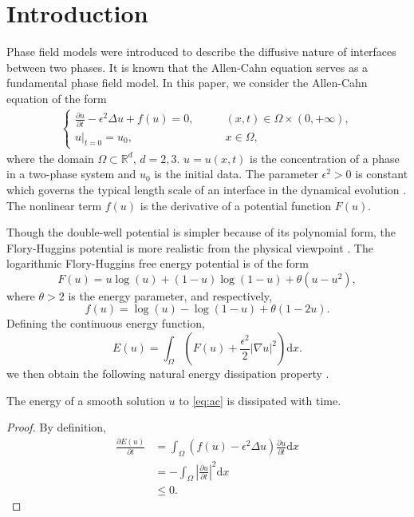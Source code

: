 \section{Introduction}
\label{section:introduction}
Phase field models \cite{chen2002phase,steinbach2013phase} were introduced to describe the diffusive nature of interfaces between two phases. 
It is known that the Allen-Cahn equation \cite{allen1979microscopic} serves as a fundamental phase field model. 
In this paper, we consider the Allen-Cahn equation of the form
\begin{align}\label{eq:ac}
      \begin{cases}
    \frac{\partial u}{\partial t}-\epsilon^2\Delta u+f(u)=0, &\qquad (x,t)\in \Omega \times (0,+\infty),\\
    u|_{t=0}=u_0,&\qquad x\in \Omega,
\end{cases}
\end{align}
where the domain $\Omega \subset \mathbb{R}^d$, $d=2,3$. $u=u(x,t)$ is the concentration of a phase in a two-phase system and $u_0$ is the initial data. 
The parameter $\epsilon^2>0$ is constant which governs the typical length scale of an interface in the dynamical evolution \cite{wang1993thermodynamically,wheeler1992phase}. 
The nonlinear term $f(u)$ is the derivative of a potential function $F(u)$. 
\par Though the double-well potential is simpler because of its polynomial form, the Flory-Huggins potential is more realistic from the physical viewpoint \cite{flory1942thermodynamics}. 
The logarithmic Flory-Huggins free energy potential is of the form
\begin{equation}
    F(u)=u\log(u)+(1-u)\log(1-u)+\theta(u-u^2),
\end{equation}
where $\theta>2$ is the energy parameter, and respectively,
\begin{equation}
    f(u)=\log(u)-\log(1-u)+\theta(1-2u).
\end{equation}
Defining the continuous energy function,
\begin{equation}
    E(u)=\int_{\Omega} (F(u)+\frac{\epsilon^2}{2}|\nabla u|^2)\text{d}x.
\end{equation}
we then obtain the following natural energy dissipation property \cite{allen1979microscopic}.
\begin{proposition}\label{prop:sta}
    The energy of a smooth solution $u$ to \eqref{eq:ac} is dissipated with time.
\end{proposition}
\begin{proof}
    By definition, 
    \begin{equation}
        \begin{aligned}
        \frac{\partial E(u)}{\partial t}
        &=\int_{\Omega}(f(u) - \epsilon^2\Delta u)\frac{\partial u}{\partial t}\text{d}x\\
        &=-\int_{\Omega}|\frac{\partial u}{\partial t}|^2\text{d}x\\
        &\leq 0.
    \end{aligned}
    \end{equation}
\end{proof}
